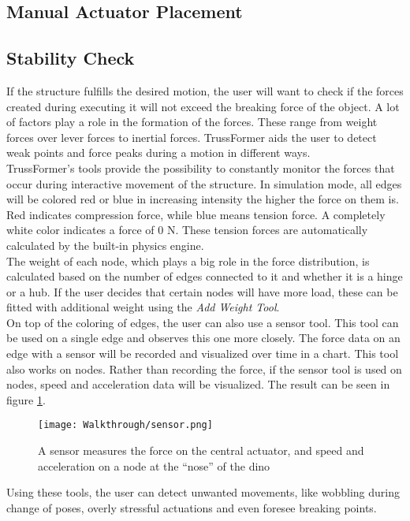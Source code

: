\subsection{Manual Actuator Placement}

\subsection{Stability Check}
If the structure fulfills the desired motion, the user will want to check if the forces created during executing it will not exceed the breaking force of the object. A lot of factors play a role in the formation of the forces. These range from weight forces over lever forces to inertial forces. TrussFormer aids the user to detect weak points and force peaks during a motion in different ways.\\
TrussFormer's tools provide the possibility to constantly monitor the forces that occur during interactive movement of the structure. In simulation mode, all edges will be colored red or blue in increasing intensity the higher the force on them is. Red indicates compression force, while blue means tension force. A completely white color indicates a force of 0 N. These tension forces are automatically calculated by the built-in physics engine.\\
The weight of each node, which plays a big role in the force distribution, is calculated based on the number of edges connected to it and whether it is a hinge or a hub. If the user decides that certain nodes will have more load, these can be fitted with additional weight using the \textit{Add Weight Tool}.\\
On top of the coloring of edges, the user can also use a sensor tool. This tool can be used on a single edge and observes this one more closely. The force data on an edge with a sensor will be recorded and visualized over time in a chart. This tool also works on nodes. Rather than recording the force, if the sensor tool is used on nodes, speed and acceleration data will be visualized. The result can be seen in figure \ref{fig:sensor}.\\
\begin{figure}[h!]
    \texttt{[image: Walkthrough/sensor.png]}
    \centering
    \caption{A sensor measures the force on the central actuator, and speed and acceleration on a node at the ``nose'' of the dino}
    \label{fig:sensor}
\end{figure}
Using these tools, the user can detect unwanted movements, like wobbling during change of poses, overly stressful actuations and even foresee breaking points.\\
